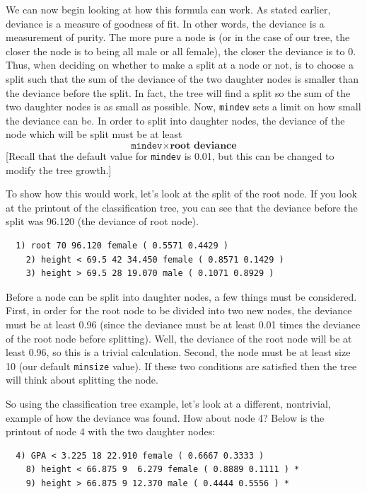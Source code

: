\documentclass[12pt,twoside]{reedthesis}
\begin{document}
  We can now begin looking at how this formula can work. As stated
  earlier, deviance is a measure of goodness of fit. In other words, the
  deviance is a measurement of purity. The more pure a node is (or in the
  case of our tree, the closer the node is to being all male or all
  female), the closer the deviance is to 0. Thus, when deciding on whether
  to make a split at a node or not, is to choose a split such that the sum
  of the deviance of the two daughter nodes is smaller than the deviance
  before the split. In fact, the tree will find a split so the sum of the
  two daughter nodes is as small as possible. Now, \texttt{mindev} sets a
  limit on how small the deviance can be. In order to split into daughter
  nodes, the deviance of the node which will be split must be at least
  \[\texttt{mindev}\times\textbf{root deviance}\] {[}Recall that the
  default value for \texttt{mindev} is 0.01, but this can be changed to
  modify the tree growth.{]}
  
  To show how this would work, let's look at the split of the root node.
  If you look at the printout of the classification tree, you can see that
  the deviance before the split was 96.120 (the deviance of root node).
  
  \begin{verbatim}
  1) root 70 96.120 female ( 0.5571 0.4429 )
    2) height < 69.5 42 34.450 female ( 0.8571 0.1429 )
    3) height > 69.5 28 19.070 male ( 0.1071 0.8929 )
  \end{verbatim}
  
  Before a node can be split into daughter nodes, a few things must be
  considered. First, in order for the root node to be divided into two new
  nodes, the deviance must be at least 0.96 (since the deviance must be at
  least 0.01 times the deviance of the root node before splitting). Well,
  the deviance of the root node will be at least 0.96, so this is a
  trivial calculation. Second, the node must be at least size 10 (our
  default \texttt{minsize} value). If these two conditions are satisfied
  then the tree will think about splitting the node.
  
  So using the classification tree example, let's look at a different,
  nontrivial, example of how the deviance was found. How about node 4?
  Below is the printout of node 4 with the two daughter nodes:
  
  \begin{verbatim}
  4) GPA < 3.225 18 22.910 female ( 0.6667 0.3333 )
    8) height < 66.875 9  6.279 female ( 0.8889 0.1111 ) *
    9) height > 66.875 9 12.370 male ( 0.4444 0.5556 ) *
  \end{verbatim}
  
\end{document}
